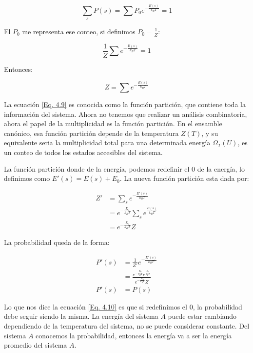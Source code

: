 \documentclass[11pt,fleqn]{book}
\begin{document}
\begin{equation}
    \sum_{s}P(s)=\sum P_{0}e^{-\frac{E(s)}{k_{B}T}}=1
    \label{Eq. 4.8}
\end{equation}

El $P_{0}$ me representa ese conteo, si definimos $P_{0}=\frac{1}{Z}$:

\begin{equation*}
\frac{1}{Z}\sum e^{-\frac{E(s)}{k_{B}T}}=1
\end{equation*}

Entonces:

\begin{equation*}
Z=\sum e^{-\frac{E(s)}{k_{B}T}}
\label{Eq. 4.9}
\end{equation*} 

La ecuación \ref{Eq. 4.9} es conocida como la función partición, que contiene toda la información del sistema. Ahora no tenemos que realizar un análisis combinatoria, ahora el papel de la multiplicidad es la función partición. En el ensamble canónico, esa función partición depende de la temperatura $Z(T)$, y su equivalente seria la multiplicidad total para una determinada energía $\Omega_{T}(U)$, es un conteo de todos los estados accesibles del sistema.

La función partición donde de la energía, podemos redefinir el $0$ de la energía, lo definimos como $E'(s)=E(s)+E_{0}$. La nueva función partición esta dada por:

\begin{equation*}
\begin{split}
     Z'&=\sum_{s}e^{-\frac{E'(s)}{k_{B}T}}\\
     &=e^{-\frac{E_{0}}{k_{B}T}}\sum_{s}e^{\frac{E(s)}{k_{B}T}}\\
     &=e^{-\frac{E_{0}}{k_{B}T}}Z
\end{split}
\end{equation*}

La probabilidad queda de la forma:

\begin{equation}
\begin{split}
       P'(s)&=\frac{1}{Z'}e^{-\frac{E'(s)}{k_{B}T}}\\
       &=\frac{e^{-\frac{E_{0}}{k_{B}T}}e^{\frac{E_{s}}{k_{B}T}}}{e^{-\frac{E_{0}}{k_{B}T}}Z}\\
       P'(s)&=P(s)
\end{split}
\label{Eq. 4.10}
\end{equation}

Lo que nos dice la ecuación \ref{Eq. 4.10} es que si redefinimos el $0$, la probabilidad debe seguir siendo la misma.  La energía del sistema $A$ puede estar cambiando dependiendo de la temperatura del sistema, no se puede considerar constante. Del sistema $A$ conocemos la probabilidad, entonces la energía va a ser la energía promedio del sistema $A$.
\end{document}
